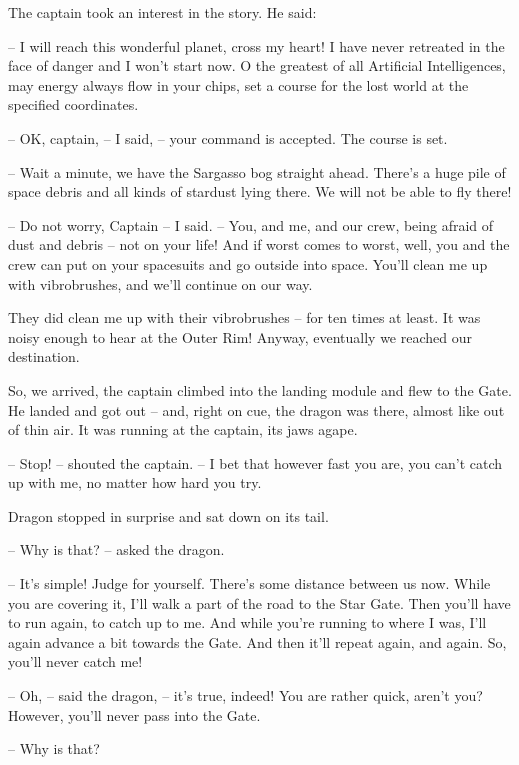 \documentclass[ebook,twoside,final,openright]{memoir}
\begin{document}
\par
The captain took an interest in the story. He said:\par
– I will reach this wonderful planet, cross my heart! I have never retreated in the face of danger and I won’t start now. O the greatest of all Artificial Intelligences, may energy always flow in your chips, set a course for the lost world at the specified coordinates.\par
– OK, captain, – I said, – your command is accepted. The course is set.\par
– Wait a minute, we have the Sargasso bog straight ahead. There's a huge pile of space debris and all kinds of stardust lying there. We will not be able to fly there!\par
– Do not worry, Captain – I said. – You, and me, and our crew, being afraid of dust and debris – not on your life! And if worst comes to worst, well, you and the crew can put on your spacesuits and go outside into space. You’ll clean me up with vibrobrushes, and we’ll continue on our way.\par
\par
They did clean me up with their vibrobrushes – for ten times at least. It was noisy enough to hear at the Outer Rim! Anyway, eventually we reached our destination.\par
\par
So, we arrived, the captain climbed into the landing module and flew to the Gate. He landed and got out – and, right on cue, the dragon was there, almost like out of thin air. It was running at the captain, its jaws agape.\par
– Stop! – shouted the captain. – I bet that however fast you are, you can’t catch up with me, no matter how hard you try.\par
Dragon stopped in surprise and sat down on its tail.\par
– Why is that? – asked the dragon.\par
– It’s simple! Judge for yourself. There’s some distance between us now. While you are covering it, I’ll walk a part of the road to the Star Gate. Then you’ll have to run again, to catch up to me. And while you’re running to where I was, I’ll again advance a bit towards the Gate. And then it’ll repeat again, and again. So, you’ll never catch me!\par
– Oh, – said the dragon, – it’s true, indeed! You are rather quick, aren’t you? However, you’ll never pass into the Gate.\par
– Why is that?\par
\end{document}
